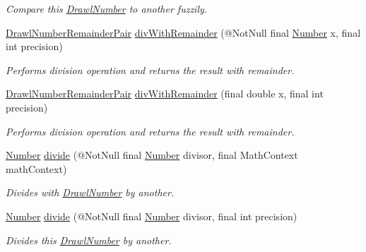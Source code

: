 \begin{DoxyCompactItemize}
\begin{DoxyCompactList}\small\item\em Compare this \hyperlink{classcom_1_1aarrelaakso_1_1drawl_1_1_drawl_number}{Drawl\+Number} to another fuzzily. \end{DoxyCompactList}\item 
\hyperlink{classcom_1_1aarrelaakso_1_1drawl_1_1_drawl_number_remainder_pair}{Drawl\+Number\+Remainder\+Pair} \hyperlink{interfacecom_1_1aarrelaakso_1_1drawl_1_1_number_abf7f5f2ea47601b2dbf399c68e4bf895}{div\+With\+Remainder} (@Not\+Null final \hyperlink{interfacecom_1_1aarrelaakso_1_1drawl_1_1_number}{Number} x, final int precision)
\begin{DoxyCompactList}\small\item\em Performs division operation and returns the result with remainder. \end{DoxyCompactList}\item 
\hyperlink{classcom_1_1aarrelaakso_1_1drawl_1_1_drawl_number_remainder_pair}{Drawl\+Number\+Remainder\+Pair} \hyperlink{interfacecom_1_1aarrelaakso_1_1drawl_1_1_number_ae3fd76a012e2afc4d71a3ccb93bace92}{div\+With\+Remainder} (final double x, final int precision)
\begin{DoxyCompactList}\small\item\em Performs division operation and returns the result with remainder. \end{DoxyCompactList}\item 
\hyperlink{interfacecom_1_1aarrelaakso_1_1drawl_1_1_number}{Number} \hyperlink{interfacecom_1_1aarrelaakso_1_1drawl_1_1_number_adfd6e1a6e96cbface21eef9b2d8860d0}{divide} (@Not\+Null final \hyperlink{interfacecom_1_1aarrelaakso_1_1drawl_1_1_number}{Number} divisor, final Math\+Context math\+Context)
\begin{DoxyCompactList}\small\item\em Divides with \hyperlink{classcom_1_1aarrelaakso_1_1drawl_1_1_drawl_number}{Drawl\+Number} by another. \end{DoxyCompactList}\item 
\hyperlink{interfacecom_1_1aarrelaakso_1_1drawl_1_1_number}{Number} \hyperlink{interfacecom_1_1aarrelaakso_1_1drawl_1_1_number_acfcd993a82faa41956430086986084e7}{divide} (@Not\+Null final \hyperlink{interfacecom_1_1aarrelaakso_1_1drawl_1_1_number}{Number} divisor, final int precision)
\begin{DoxyCompactList}\small\item\em Divides this \hyperlink{classcom_1_1aarrelaakso_1_1drawl_1_1_drawl_number}{Drawl\+Number} by another. \end{DoxyCompactList}\item 

\end{DoxyCompactItemize}
